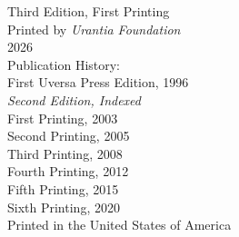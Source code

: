 \begin{center}
Third Edition, First Printing\\
Printed by \emph{Urantia Foundation}\\
2026\\[1ex]
Publication History:\\[3pt]
First Uversa Press Edition, 1996\\[2pt]
\emph{Second Edition, Indexed}\\
First Printing, 2003\\
Second Printing, 2005\\
Third Printing, 2008\\
Fourth Printing, 2012\\
Fifth Printing, 2015\\
Sixth Printing, 2020\\[14ex]
\sizefive
Printed in the United States of America\\
\end{center}
